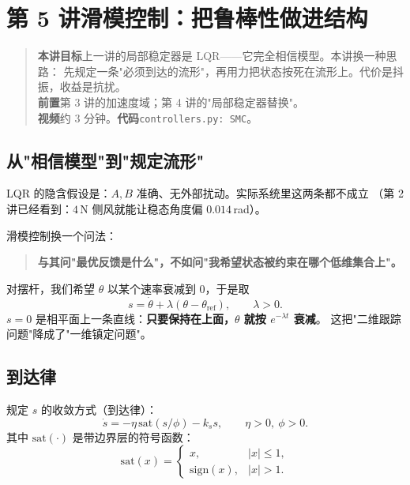 \chapter[滑模]{第 5 讲\quad 滑模控制：把鲁棒性做进结构}
\label{ch:smc}

\begin{quote}\small
\textbf{本讲目标}\quad 上一讲的局部稳定器是 LQR——它完全相信模型。本讲换一种思路：
先规定一条"必须到达的流形"，再用力把状态按死在流形上。代价是抖振，收益是抗扰。\\[2pt]
\textbf{前置}\quad 第 3 讲的加速度域；第 4 讲的"局部稳定器替换"。\\
\textbf{视频}\quad 约 3 分钟。\quad\textbf{代码}\quad \texttt{controllers.py: SMC}。
\end{quote}

\section{从"相信模型"到"规定流形"}

LQR 的隐含假设是：$A,B$ 准确、无外部扰动。实际系统里这两条都不成立
（第 2 讲已经看到：$4$\,N 侧风就能让稳态角度偏 $0.014$\,rad）。

滑模控制换一个问法：

\begin{quote}
\textbf{与其问"最优反馈是什么"，不如问"我希望状态被约束在哪个低维集合上"。}
\end{quote}

对摆杆，我们希望 $\theta$ 以某个速率衰减到 0，于是取
\begin{equation}
  s=\dot\theta+\lambda(\theta-\theta_{\mathrm{ref}}),\qquad \lambda>0 .
  \label{eq:surface}
\end{equation}
$s=0$ 是相平面上一条直线：\textbf{只要保持在上面，$\theta$ 就按 $e^{-\lambda t}$ 衰减}。
这把"二维跟踪问题"降成了"一维镇定问题"。

\section{到达律}

规定 $s$ 的收敛方式（到达律）：
\begin{equation}
  \dot s=-\eta\,\mathrm{sat}(s/\phi)-k_s s,\qquad \eta>0,\ \phi>0 .
  \label{eq:reach}
\end{equation}
其中 $\mathrm{sat}(\cdot)$ 是带边界层的符号函数：
\begin{equation}
  \mathrm{sat}(x)=\begin{cases}
    x, & |x|\le1,\\
    \mathrm{sign}(x), & |x|>1 .
  \end{cases}
\end{equation}

